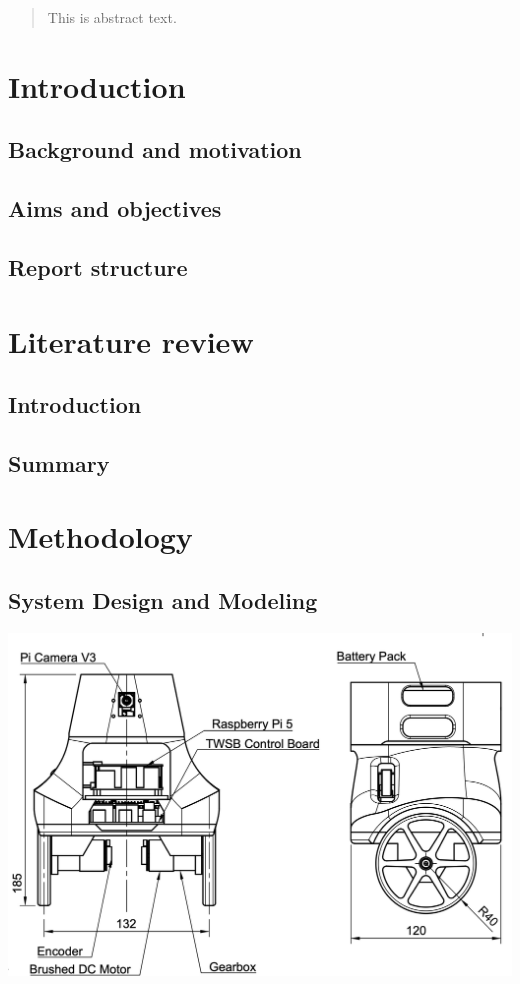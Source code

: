   \uomtoc

  \begin{abstract} %
    This is abstract text.
  \end{abstract}%
  \clearpage
  \section{Introduction}
    \subsection{Background and motivation}
    \subsection{Aims and objectives}
    \subsection{Report structure}
  \section{Literature review} %
    \subsection{Introduction}
      \subsection{Summary}
  \pagebreak{}
  \section{Methodology } %
    \subsection{System Design and Modeling }
    \includegraphics[width=\textwidth]{bBotV2TechDraw.jpg}
    
